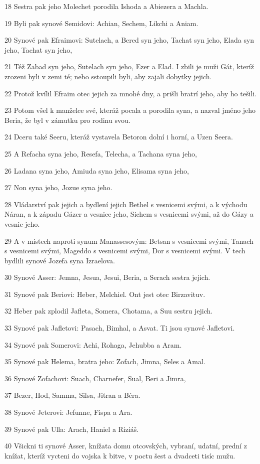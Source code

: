 \par 18 Sestra pak jeho Molechet porodila Ishoda a Abiezera a Machla.
\par 19 Byli pak synové Semidovi: Achian, Sechem, Likchi a Aniam.
\par 20 Synové pak Efraimovi: Sutelach, a Bered syn jeho, Tachat syn jeho, Elada syn jeho, Tachat syn jeho,
\par 21 Též Zabad syn jeho, Sutelach syn jeho, Ezer a Elad. I zbili je muži Gát, kteríž zrozeni byli v zemi té; nebo sstoupili byli, aby zajali dobytky jejich.
\par 22 Protož kvílil Efraim otec jejich za mnohé dny, a prišli bratrí jeho, aby ho tešili.
\par 23 Potom všel k manželce své, kteráž pocala a porodila syna, a nazval jméno jeho Beria, že byl v zámutku pro rodinu svou.
\par 24 Dceru také Seeru, kteráž vystavela Betoron dolní i horní, a Uzen Seera.
\par 25 A Refacha syna jeho, Resefa, Telecha, a Tachana syna jeho,
\par 26 Ladana syna jeho, Amiuda syna jeho, Elisama syna jeho,
\par 27 Non syna jeho, Jozue syna jeho.
\par 28 Vládarství pak jejich a bydlení jejich Bethel s vesnicemi svými, a k východu Náran, a k západu Gázer a vesnice jeho, Sichem s vesnicemi svými, až do Gázy a vesnic jeho.
\par 29 A v místech naproti synum Manassesovým: Betsan s vesnicemi svými, Tanach s vesnicemi svými, Mageddo s vesnicemi svými, Dor s vesnicemi svými. V tech bydlili synové Jozefa syna Izraelova.
\par 30 Synové Asser: Jemna, Jesua, Jesui, Beria, a Serach sestra jejich.
\par 31 Synové pak Beriovi: Heber, Melchiel. Ont jest otec Birzavituv.
\par 32 Heber pak zplodil Jafleta, Somera, Chotama, a Suu sestru jejich.
\par 33 Synové pak Jafletovi: Pasach, Bimhal, a Asvat. Ti jsou synové Jafletovi.
\par 34 Synové pak Somerovi: Achi, Rohaga, Jehubba a Aram.
\par 35 Synové pak Helema, bratra jeho: Zofach, Jimna, Seles a Amal.
\par 36 Synové Zofachovi: Suach, Charnefer, Sual, Beri a Jimra,
\par 37 Bezer, Hod, Samma, Silsa, Jitran a Béra.
\par 38 Synové Jeterovi: Jefunne, Fispa a Ara.
\par 39 Synové pak Ulla: Arach, Haniel a Riziáš.
\par 40 Všickni ti synové Asser, knížata domu otcovských, vybraní, udatní, prední z knížat, kteríž vycteni do vojska k bitve, v poctu šest a dvadceti tisíc mužu.

